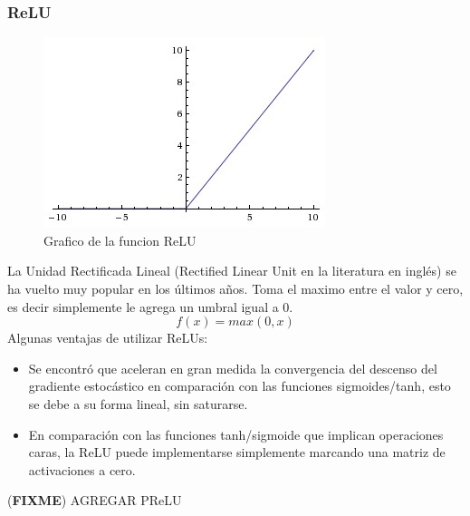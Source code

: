 \documentclass[a4paper,11pt,spanish]{book}
\newcommand*{\FIXME}[1]{{(\textbf{FIXME}) {#1}}}
\begin{document}
	  \subsubsection {ReLU}
	    \begin{figure}[H]
	      \includegraphics[scale=0.5]{./img/relu.jpeg}
	      \caption{Grafico de la funcion ReLU}
	      \label{fig:relu}
	    \end{figure}
	    La Unidad Rectificada Lineal (Rectified Linear Unit en la literatura en inglés) se ha vuelto muy popular en los últimos años. Toma el maximo entre el valor y cero, es decir
	    simplemente le agrega un umbral igual a 0.
	    \begin{equation}
	     f(x) = max(0,x)
	    \end{equation}
	    Algunas ventajas de utilizar ReLUs:
	    \begin{itemize}
	      \item Se encontró que aceleran en gran medida la convergencia del descenso del gradiente estocástico en comparación con las funciones sigmoides/tanh, esto se debe a su forma lineal, sin saturarse.
	      \item En comparación con las funciones tanh/sigmoide que implican operaciones caras, la ReLU puede implementarse simplemente marcando una matriz de activaciones a cero.
	    \end{itemize}
            \FIXME{AGREGAR PReLU}
\end{document}
